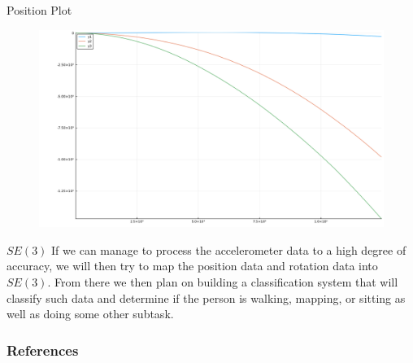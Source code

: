 \documentclass[10pt]{beamer}
\begin{document}
\begin{frame} {Position Plot}
\begin{figure}
\includegraphics[width=\linewidth,height=\textheight,keepaspectratio]{images/position}
\end{figure}
\end{frame}

\begin{frame} {$SE(3)$}
If we can manage to process the accelerometer data to a high degree of accuracy, we will then try to map the position data and rotation data into $SE(3)$. From there we then plan on building a classification system that will classify such data and determine if the person is walking, mapping, or sitting as well as doing some other subtask. 
\end{frame}

\begin{frame}
\frametitle{References}


\end{frame}
\end{document}
